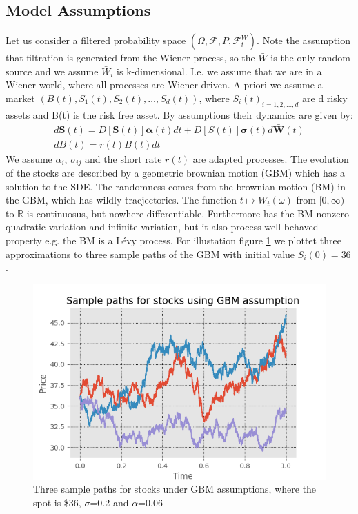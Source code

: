 \subsection{Model Assumptions}
Let us consider a filtered probability space $(\Omega, \mathcal{F}, P, \mathcal{F}_t^{\bar{W}})$. Note the assumption that filtration is generated from the Wiener process, so the $\bar{W}$ is the only random source and we assume $\bar{W}_i$ is k-dimensional. I.e. we assume that we are in a Wiener world, where all processes are Wiener driven. A priori we assume a market $(B(t),S_1(t), S_2(t),\ldots, S_d(t))$, where ${S_i(t)}_{i=1,2,\ldots,d}$ are d risky assets and B(t) is the risk free asset. By assumptions their dynamics are given by:\\
\begin{align}
d\bm{S}(t)=D[\bm{S}(t)]\bm{\alpha}(t)dt+D[S(t)]\bm{\sigma}(t)d\bar{\bm{W}}(t)\label{GBM-P} \\
dB(t)=r(t)B(t)dt
\end{align}
We assume $\alpha_i$, $\sigma_{ij}$ and the short rate $r(t)$ are adapted processes. The evolution of the stocks are described by a geometric brownian motion (GBM) which has a solution to the SDE. The randomness comes from the brownian motion (BM) in the GBM, which has wildly tracjectories. The function $t\mapsto W_{t}(\omega)$ from $[0,\infty)$ to $\mathbb{R}$ is continuosus, but nowhere differentiable. Furthermore has the BM nonzero quadratic variation and infinite variation, but it also process well-behaved property e.g. the BM is a Lévy process. For illustation figure \ref{fig:BM} we plottet three approximations to three sample paths of the GBM with initial value $S_{i}(0)=36$.

\begin{figure}[H]
\centering
\includegraphics{Figures/samplePath.png}
\decoRule
\caption[Sample Path For Stocks]{Three sample paths for stocks under GBM assumptions, where the spot is \$36, $\sigma$=0.2 and $\alpha$=0.06}
\label{fig:BM}
\end{figure}

